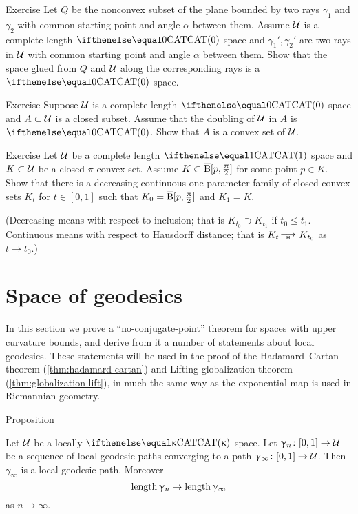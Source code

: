 \begin{thm}{Exercise}\label{ex:two-rays}
Let $Q$ be the nonconvex subset of the plane 
bounded by two rays $\gamma_1$ and $\gamma_2$
with common starting point and angle $\alpha$ between them.
Assume $\mathcal{U}$ is a complete length $\CAT0$ space
and $\gamma_1',\gamma_2'$ are two rays in $\mathcal{U}$ with common
starting point and angle $\alpha$ between them.
Show that the space glued from $Q$ and $\mathcal{U}$ along the corresponding rays is a $\CAT{0}$ space.
\end{thm}

\begin{thm}{Exercise}\label{ex:reshetnyak-doubling}
Suppose $\mathcal{U}$ is a complete length $\CAT0$ space and $A\subset \spc{U}$ is a closed subset.
Assume that the doubling of $\mathcal{U}$ in $A$ is $\CAT0$. 
Show that $A$ is a convex set of $\mathcal{U}$.
\end{thm}

\begin{thm}{Exercise}\label{ex:glue-spherical-suspension}
Let  $\mathcal{U}$ be a complete length $\CAT1$ space and $K\subset \spc{U}$ be a closed $\pi$-convex set.
Assume $K\subset \cBall[p,\tfrac\pi2]$ for some point $p\in K$.
Show that there is a decreasing continuous one-parameter family of closed convex sets $K_t$ for $t\in[0,1]$ such that $K_0=\overline{\mathrm{B}}{}[p,\tfrac{\uppi}2]$ and $K_1=K$.

(Decreasing means with respect to inclusion; that is $K_{t_0}\supset K_{t_1}$ if $t_0\le t_1$.
Continuous means with respect to Hausdorff distance; that is $K_t\Hto K_{t_0}$ as $t\to t_0$.)
\end{thm}



\section{Space of geodesics}\label{sec:geod-space}

In this section we prove a  ``no-conjugate-point'' theorem for spaces with upper curvature bounds, and derive from it a number of statements about
local geodesics.  These statements will be used in the proof of the Hadamard--Cartan theorem (\ref{thm:hadamard-cartan}) and Lifting
 globalization theorem (\ref{thm:globalization-lift}), in much the same way as  the exponential map is used in Riemannian geometry.

\begin{thm}{Proposition}\label{prop:geo-complete}
{\sloppy 
Let $\mathcal{U}$ be a locally $\CAT\kappa$ space.
 Let $\gamma_n\:[0,1]\to\spc{U}$ be a sequence of local geodesic paths converging to a path $\gamma_\infty\:[0,1]\to\spc{U}$.
Then $\gamma_\infty$ is a local geodesic path.
Moreover 
\[\length\gamma_n\to\length\gamma_\infty\]
as $n\to\infty$.

}
\end{thm}


